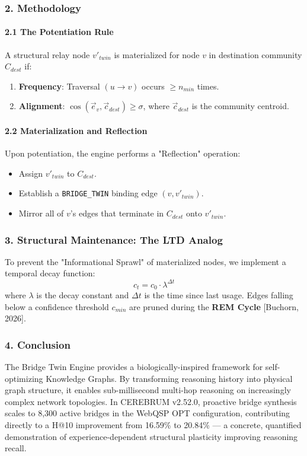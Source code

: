 \subsubsection{2. Methodology}

\paragraph{2.1 The Potent\-iation Rule}
A structural relay node $v'_{twin}$ is mater\-ialized for node $v$ in destination community $C_{dest}$ if:
\begin{enumerate}
\item \textbf{Frequency}: Traversal $(u \to v)$ occurs $\geq n_{min}$ times.
\item \textbf{Alignment}: $\cos(\vec{e}_v, \vec{c}_{dest}) \geq \sigma$, where $\vec{c}_{dest}$ is the community centroid.

\end{enumerate}
\paragraph{2.2 Materi\-alization and Reflection}
Upon poten\-tiation, the engine performs a "Reflection" operation:
\begin{itemize}
\item Assign $v'_{twin}$ to $C_{dest}$.
\item Establish a \texttt{BRIDGE\_TWIN} binding edge $(v, v'_{twin})$.
\item Mirror all of $v$'s edges that terminate in $C_{dest}$ onto $v'_{twin}$.

\end{itemize}
\subsubsection{3. Structural Maintenance: The LTD Analog}
To prevent the "Inform\-ational Sprawl" of mater\-ialized nodes, we implement a temporal decay function:
\begin{equation}
c_t = c_0 \cdot \lambda^{\Delta t}
\end{equation}
where $\lambda$ is the decay constant and $\Delta t$ is the time since last usage. Edges falling below a confidence threshold $c_{min}$ are pruned during the \textbf{REM Cycle} [Buchorn, 2026].

\subsubsection{4. Conclusion}
The Bridge Twin Engine provides a biolo\-gically-inspired framework for self-optimizing Knowledge Graphs. By trans\-forming reasoning history into physical graph structure, it enables sub-millisecond multi-hop reasoning on incre\-asingly complex network topologies. In CEREBRUM v2.52.0, proactive bridge synthesis scales to 8,300 active bridges in the WebQSP OPT confi\-guration, contr\-ibuting directly to a H@10 improvement from 16.59\% to 20.84\% — a concrete, quantified demon\-stration of experience-dependent structural plasticity improving reasoning recall.

